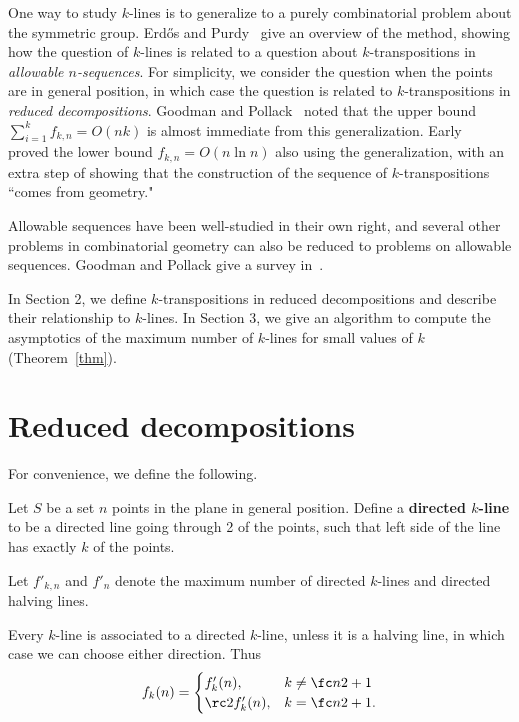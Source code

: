 \documentclass[12pt, reqno]{amsart}
\begin{document}
One way to study $k$-lines is to generalize to a purely combinatorial problem about the symmetric group. Erd\H{o}s and Purdy~\cite{EP95} give an overview of the method, showing how the question of $k$-lines is related to a question about $k$-transpositions in {\it allowable $n$-sequences}. For simplicity, we consider the question when the points are in general position, in which case the question is related to $k$-transpositions in {\it reduced decompositions}. 
Goodman and Pollack~\cite{GP84} noted that the upper bound $\sum_{i=1}^k f_{k,n}= O(nk)$ is almost immediate from this generalization. Early~\cite{Ea99} proved the lower bound $f_{k,n}=O(n\ln n)$ also using the generalization, with an extra step of showing that the construction of the sequence of $k$-transpositions ``comes from geometry."

Allowable sequences have been well-studied in their own right, and several other problems in combinatorial geometry can also be reduced to problems on allowable sequences. Goodman and Pollack give a survey in~\cite{GP93}.

In Section 2, we define $k$-transpositions in reduced decompositions and describe their relationship to $k$-lines. In Section 3, we give an algorithm to compute the asymptotics of the maximum number of $k$-lines for small values of $k$ (Theorem~\ref{thm}).

\section{Reduced decompositions}

For convenience, we define the following.

\begin{df}
Let $S$ be a set $n$ points in the plane in general position. Define a \textbf{directed $k$-line} to be a directed line going through 2 of the points, such that left side of the line has exactly $k$ of the points.
\end{df}
Let $f'_{k,n}$ and $f'_n$ denote the maximum number of directed $k$-lines and directed halving lines.

Every $k$-line is associated to a directed $k$-line, unless it is a halving line, in which case we can choose either direction. Thus
\[
f_k(n)=\begin{cases}
f'_k(n),&k\ne \fc n2+1\\
\rc2f'_k(n),&k=\fc n2+1.
\end{cases}
\]
\end{document}
